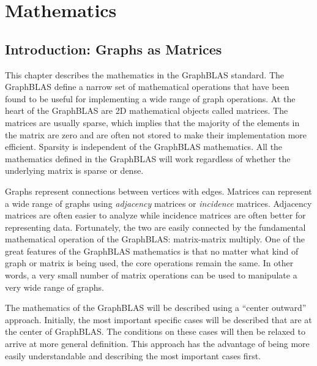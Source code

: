 %

%

\chapter{Mathematics}
\label{chap:mathematics}
\section{Introduction: Graphs as Matrices}
This chapter describes the mathematics in the GraphBLAS standard.  The GraphBLAS define a narrow set of mathematical operations that have been found to be useful for implementing a wide range of graph operations.  At the heart of the GraphBLAS are 2D mathematical objects called matrices.  The matrices are usually sparse, which implies that the majority of the elements in the matrix are zero and are often not stored to make their implementation more efficient.  Sparsity is independent of the GraphBLAS mathematics.  All the mathematics defined in the GraphBLAS will work regardless of whether the underlying matrix is sparse or dense.

Graphs represent connections between vertices with edges.  Matrices can represent a wide range of graphs using \emph{adjacency} matrices or \emph{incidence} matrices.  Adjacency matrices are often easier to analyze while incidence matrices are often better for representing data.  Fortunately, the two are easily connected by the fundamental mathematical operation of the GraphBLAS: matrix-matrix multiply.  One of the great features of the GraphBLAS mathematics is that no matter what kind of graph or matrix is being used, the core operations remain the same.  In other words, a very small number of matrix operations can be used to manipulate a very wide range of graphs.

The mathematics of the GraphBLAS will be described using a ``center outward'' approach.  Initially, the most important specific cases will be described that are at the center of GraphBLAS.  The conditions on these cases will then be relaxed to arrive at more general definition.  This approach has the advantage of being more easily understandable and describing the most important cases first.

